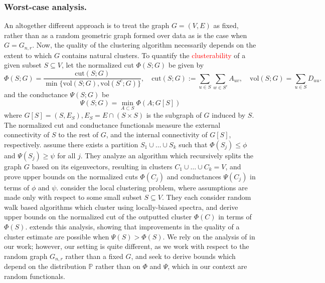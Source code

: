 \documentclass{article}
\newcommand{\vol}{\mathrm{vol}}
\newcommand{\1}{\mathbf{1}}
\newcommand{\Pbb}{\mathbb{P}}
\newcommand{\cut}{\textrm{cut}}
\theoremstyle{alden}
\theoremstyle{aldenthm}
\theoremstyle{definition}
\theoremstyle{remark}
\begin{document}
\subsubsection{Worst-case analysis.}
\label{subsubsec:worst_case_analysis}

An altogether different approach is to treat the graph $G = (V,E)$ as fixed, rather than as a random geometric graph formed over data as is the case when $G = G_{n,r}$. Now, the quality of the clustering algorithm necessarily depends on the extent to which $G$ contains natural clusters. To quantify the \textcolor{red}{clusterability} of a given subset $S \subseteq V$, let the normalized cut $\Phi(S;G)$ be given by
\begin{equation*}
\Phi(S;G) = \frac{\cut(S;G)}{\min\{\vol(S;G), \vol(S^c;G)\}},\quad \cut(S;G) := \sum_{u \in S} \sum_{w \in S^c} A_{uv}, \quad \vol(S;G) = \sum_{u \in S} D_{uu}.
\end{equation*}
and the conductance $\Psi(S;G)$ be 
\begin{equation*}
\Psi(S;G) = \min_{A \subset S} \Phi(A;G[S])
\end{equation*}
where $G[S] = (S,E_S), E_S = E \cap (S \times S)$ is the subgraph of $G$ induced by $S$. The normalized cut and conductance functionals measure the external connectivity of $S$ to the rest of $G$, and the internal connectivity of $G[S]$, respectively. \cite{kannan04} assume there exists a partition $S_1 \cup \ldots \cup S_k$ such that $\Phi(S_j) \leq \phi$ and $\Psi(S_j) \geq \psi$ for all $j$. They analyze an algorithm which recursively splits the graph $G$ based on its eigenvectors, resulting in clusters $C_1 \cup \ldots \cup C_k = V$, and prove upper bounds on the normalized cuts $\Phi(C_j)$ and conductances $\Psi(C_j)$ in terms of $\phi$ and $\psi$. \citet{spielman2013,andersen2006} consider the local clustering problem, where assumptions are made only with respect to some small subset $S \subseteq V$. They each consider random walk based algorithms which cluster using locally-biased spectra, and derive upper bounds on the normalized cut of the outputted cluster $\Phi(C)$ in terms of $\Phi(S)$. \cite{zhu2013} extends this analysis, showing that improvements in the quality of a cluster estimate are possible when $\Psi(S) > \Phi(S)$. We rely on the analysis of \cite{zhu2013} in our work; however, our setting is quite different, as we work with respect to the random graph $G_{n,r}$ rather than a fixed $G$, and seek to derive bounds which depend on the distribution $\Pbb$ rather than on $\Phi$ and $\Psi$, which in our context are random functionals.
\end{document}
